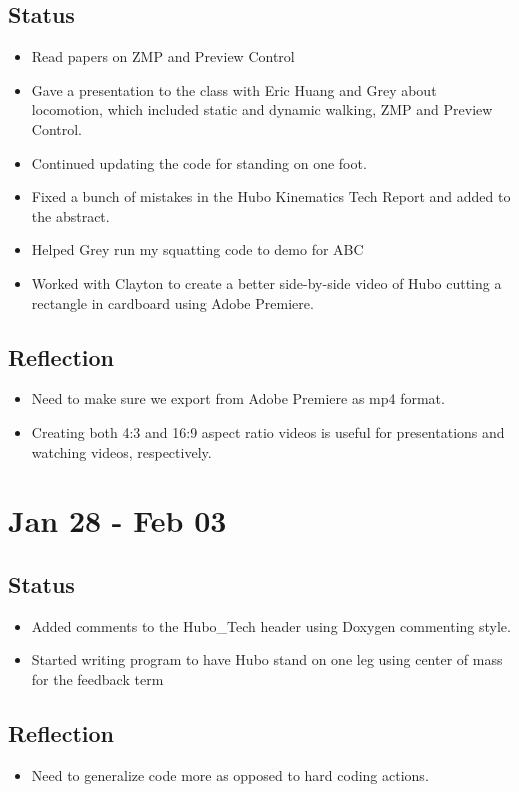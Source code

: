\documentclass[letterpaper, 10 pt]{report}
\begin{document}
\subsection*{Status}
\begin{itemize}
\item Read papers on ZMP and Preview Control
\item Gave a presentation to the class with Eric Huang and Grey about locomotion,
which included static and dynamic walking, ZMP and Preview Control.
\item Continued updating the code for standing on one foot.
\item Fixed a bunch of mistakes in the Hubo Kinematics Tech Report and added to the
abstract.
\item Helped Grey run my squatting code to demo for ABC
\item Worked with Clayton to create a better side-by-side video of Hubo cutting a
rectangle in cardboard using Adobe Premiere.
\end{itemize}
\subsection*{Reflection}
\begin{itemize}
\item Need to make sure we export from Adobe Premiere as mp4 format.
\item Creating both 4:3 and 16:9 aspect ratio videos is useful for presentations and
watching videos, respectively.
\end{itemize}

\section*{Jan 28 - Feb 03}
\subsection*{Status}
\begin{itemize}
\item Added comments to the Hubo\_Tech header using Doxygen commenting style.
\item Started writing program to have Hubo stand on one leg using center of mass for
the feedback term
\end{itemize}
\subsection*{Reflection}
\begin{itemize}
\item Need to generalize code more as opposed to hard coding actions.
\end{itemize}
\end{document}
